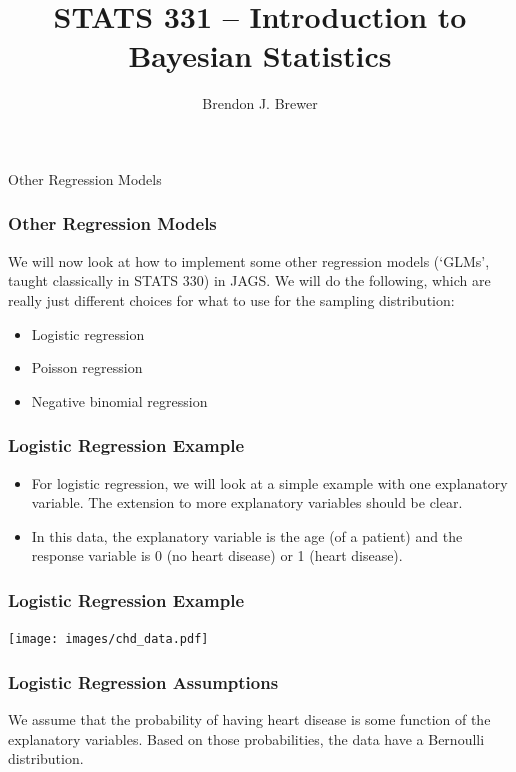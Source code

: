 \documentclass{beamer}
\author{Brendon J. Brewer}
\title{STATS 331 -- Introduction to Bayesian Statistics}
\institute{The University of Auckland}
\date{}
\begin{document}
\frame{\titlepage}

\begin{frame}
\centering
\Large
Other Regression Models

\end{frame}


\begin{frame}
\frametitle{Other Regression Models}
We will now look at how to implement some other regression models
(`GLMs', taught classically in STATS 330) in JAGS.
We will do the following, which are really just different choices for
what to use for the sampling distribution:

\begin{itemize}
\item Logistic regression \pause
\item Poisson regression \pause
\item Negative binomial regression
\end{itemize}

\end{frame}


\begin{frame}
\frametitle{Logistic Regression Example}
\begin{itemize}
\item For logistic regression, we will look at a simple example with one
explanatory variable. The extension to more explanatory variables should be
clear.\pause
\item In this data, the explanatory variable is the age (of a patient)
and the response variable is 0 (no heart disease) or 1 (heart disease).
\end{itemize}

\end{frame}

\begin{frame}
\frametitle{Logistic Regression Example}

\begin{center}
\texttt{[image: images/chd\_data.pdf]}
\end{center}

\end{frame}

\begin{frame}
\frametitle{Logistic Regression Assumptions}
We assume that the probability of having heart disease is some function of the
explanatory variables. Based on those probabilities,
the data have a Bernoulli distribution.
\end{frame}
\end{document}
